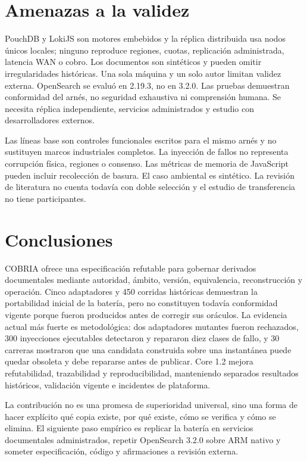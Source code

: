\documentclass[11pt]{article}
\begin{document}
\section{Amenazas a la validez}
PouchDB y LokiJS son motores embebidos y la réplica distribuida usa nodos únicos locales; ninguno reproduce regiones, cuotas, replicación administrada, latencia WAN o cobro. Los documentos son sintéticos y pueden omitir irregularidades históricas. Una sola máquina y un solo autor limitan validez externa. OpenSearch se evaluó en 2.19.3, no en 3.2.0. Las pruebas demuestran conformidad del arnés, no seguridad exhaustiva ni comprensión humana. Se necesita réplica independiente, servicios administrados y estudio con desarrolladores externos.

Las líneas base son controles funcionales escritos para el mismo arnés y no sustituyen marcos industriales completos. La inyección de fallos no representa corrupción física, regiones o consenso. Las métricas de memoria de JavaScript pueden incluir recolección de basura. El caso ambiental es sintético. La revisión de literatura no cuenta todavía con doble selección y el estudio de transferencia no tiene participantes.

\section{Conclusiones}
COBRIA ofrece una especificación refutable para gobernar derivados documentales mediante autoridad, ámbito, versión, equivalencia, reconstrucción y operación. Cinco adaptadores y 450 corridas históricas demuestran la portabilidad inicial de la batería, pero no constituyen todavía conformidad vigente porque fueron producidos antes de corregir sus oráculos. La evidencia actual más fuerte es metodológica: dos adaptadores mutantes fueron rechazados, 300 inyecciones ejecutables detectaron y repararon diez clases de fallo, y 30 carreras mostraron que una candidata construida sobre una instantánea puede quedar obsoleta y debe repararse antes de publicar. Core 1.2 mejora refutabilidad, trazabilidad y reproducibilidad, manteniendo separados resultados históricos, validación vigente e incidentes de plataforma.

La contribución no es una promesa de superioridad universal, sino una forma de hacer explícito qué copia existe, por qué existe, cómo se verifica y cómo se elimina. El siguiente paso empírico es replicar la batería en servicios documentales administrados, repetir OpenSearch 3.2.0 sobre ARM nativo y someter especificación, código y afirmaciones a revisión externa.
\end{document}
